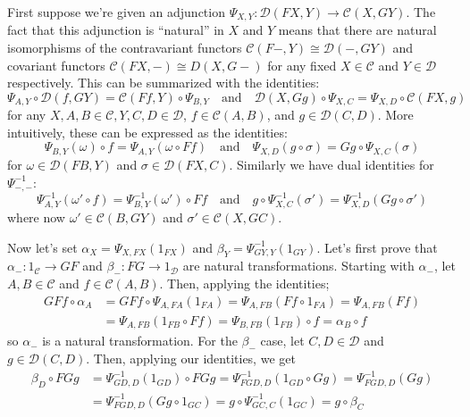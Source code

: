 \documentclass[11pt,letterpaper]{article}
\def\CC{\mathcal{C}}
\def\DD{\mathcal{D}}
\begin{document}
\begin{solution}
    \quad First suppose we're given an adjunction $\Psi_{X,Y} : \DD(FX, Y) \to \CC(X, GY)$. The fact that this adjunction is ``natural'' in $X$ and $Y$ means that there are natural isomorphisms of the contravariant functors $\CC(F-, Y)\cong \DD(-, GY)$ and covariant functors $\CC(FX, -)\cong D(X, G-)$ for any fixed $X\in \CC$ and $Y\in \DD$ respectively. This can be summarized with the identities:
    \[
        \Psi_{A, Y} \circ \DD(f, GY) = \CC(Ff, Y)\circ\Psi_{B,Y}\quad\text{and}\quad \DD(X,Gg)\circ \Psi_{X,C} = \Psi_{X,D}\circ \CC(FX,g)
    \]
    for any $X,A,B\in \CC, Y,C,D\in \DD$, $f\in \CC(A,B)$, and $g\in\DD(C,D)$. More intuitively, these can be expressed as the identities:
    \[
        \boxed{\Psi_{B, Y}(\omega)\circ f = \Psi_{A, Y}(\omega\circ Ff)}\quad \text{and}\quad \boxed{\Psi_{X,D}(g\circ\sigma) = Gg\circ\Psi_{X,C}(\sigma)}
    \]
    for $\omega\in \DD(FB,Y)$ and $\sigma\in \DD(FX, C)$. Similarly we have dual identities for $\Psi^{-1}_{-,-}$: 
    \[
        \boxed{\Psi^{-1}_{A, Y}(\omega'\circ f) = \Psi_{B, Y}^{-1}(\omega')\circ Ff}\quad \text{and}\quad\boxed{ g\circ\Psi_{X,C}^{-1}(\sigma') = \Psi^{-1}_{X,D}(Gg\circ\sigma')}
    \]
    where now $\omega'\in \CC(B,GY)$ and $\sigma'\in \CC(X,GC)$.   
    
    \quad Now let's set $\alpha_X=\Psi_{X,FX}(1_{FX})$ and $\beta_Y = \Psi_{GY,Y}^{-1}(1_{GY})$. Let's first prove that $\alpha_- : 1_\CC \to GF$ and $\beta_- : FG \to 1_\DD$ are natural transformations. Starting with $\alpha_-$, let $A,B\in \CC$ and $f\in \CC(A,B)$. Then, applying the identities;
    \[
        \begin{aligned}
            GFf\circ \alpha_A &= GFf\circ \Psi_{A,FA}(1_{FA})=\Psi_{A, FB}(Ff\circ 1_{FA})=\Psi_{A,FB}(Ff)\\
            &=\Psi_{A,FB}(1_{FB}\circ Ff)=\Psi_{B,FB}(1_{FB})\circ f=\alpha_B\circ f
        \end{aligned}
    \]
    so $\alpha_-$ is a natural transformation. For the $\beta_-$ case, let $C,D\in \DD$ and $g\in \DD(C,D)$. Then, applying our identities, we get
    \[
        \begin{aligned}
            \beta_D\circ FGg &= \Psi^{-1}_{GD,D}(1_{GD})\circ FGg = \Psi^{-1}_{FGD,D}(1_{GD}\circ Gg)=\Psi^{-1}_{FGD,D}(Gg)\\
            &=\Psi^{-1}_{FGD,D}(Gg\circ 1_{GC})=g\circ\Psi^{-1}_{GC,C}(1_{GC})=g\circ \beta_C
        \end{aligned}
    \] 
    

\end{solution}
\end{document}
